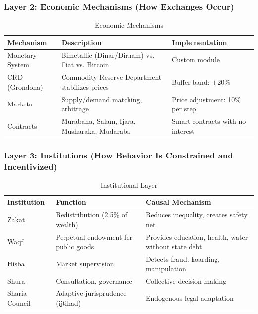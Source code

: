 \documentclass[12pt,a4paper]{article}
\begin{document}
\subsubsection{Layer 2: Economic Mechanisms (How Exchanges Occur)}

\begin{table}[H]
\centering
\caption{Economic Mechanisms}
\label{tab:layer2}
\begin{tabular}{p{3cm} p{5cm} p{5cm}}
\toprule
\textbf{Mechanism} & \textbf{Description} & \textbf{Implementation} \\
\midrule
Monetary System & Bimetallic (Dinar/Dirham) vs. Fiat vs. Bitcoin & Custom module \\
CRD (Grondona) & Commodity Reserve Department stabilizes prices & Buffer band: $\pm$20\% \\
Markets & Supply/demand matching, arbitrage & Price adjustment: 10\% per step \\
Contracts & Murabaha, Salam, Ijara, Musharaka, Mudaraba & Smart contracts with no interest \\
\bottomrule
\end{tabular}
\end{table}

\subsubsection{Layer 3: Institutions (How Behavior Is Constrained and Incentivized)}

\begin{table}[H]
\centering
\caption{Institutional Layer}
\label{tab:layer3}
\begin{tabular}{p{3cm} p{5cm} p{5cm}}
\toprule
\textbf{Institution} & \textbf{Function} & \textbf{Causal Mechanism} \\
\midrule
Zakat & Redistribution (2.5\% of wealth) & Reduces inequality, creates safety net \\
Waqf & Perpetual endowment for public goods & Provides education, health, water without state debt \\
Hisba & Market supervision & Detects fraud, hoarding, manipulation \\
Shura & Consultation, governance & Collective decision-making \\
Sharia Council & Adaptive jurisprudence (ijtihad) & Endogenous legal adaptation \\
\bottomrule
\end{tabular}
\end{table}
\end{document}
